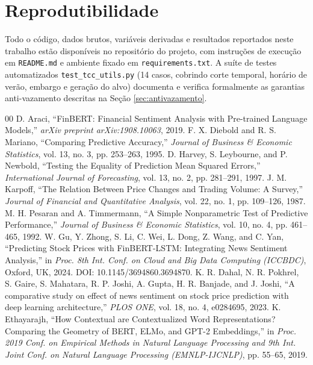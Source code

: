 \documentclass[conference]{IEEEtran}
\begin{document}
\section*{Reprodutibilidade}
Todo o c\'odigo, dados brutos, vari\'aveis derivadas e resultados reportados neste trabalho est\~ao dispon\'iveis no reposit\'orio do projeto, com instru\c{c}\~oes de execu\c{c}\~ao em \texttt{README.md} e ambiente fixado em \texttt{requirements.txt}. A su\'ite de testes automatizados \texttt{test\_tcc\_utils.py} (14 casos, cobrindo corte temporal, hor\'ario de ver\~ao, embargo e gera\c{c}\~ao do alvo) documenta e verifica formalmente as garantias anti-vazamento descritas na Se\c{c}\~ao \ref{sec:antivazamento}.

\begin{thebibliography}{00}
 D. Araci, ``FinBERT: Financial Sentiment Analysis with Pre-trained Language Models,'' \emph{arXiv preprint arXiv:1908.10063}, 2019.
 F. X. Diebold and R. S. Mariano, ``Comparing Predictive Accuracy,'' \emph{Journal of Business \& Economic Statistics}, vol. 13, no. 3, pp. 253--263, 1995.
 D. Harvey, S. Leybourne, and P. Newbold, ``Testing the Equality of Prediction Mean Squared Errors,'' \emph{International Journal of Forecasting}, vol. 13, no. 2, pp. 281--291, 1997.
 J. M. Karpoff, ``The Relation Between Price Changes and Trading Volume: A Survey,'' \emph{Journal of Financial and Quantitative Analysis}, vol. 22, no. 1, pp. 109--126, 1987.
 M. H. Pesaran and A. Timmermann, ``A Simple Nonparametric Test of Predictive Performance,'' \emph{Journal of Business \& Economic Statistics}, vol. 10, no. 4, pp. 461--465, 1992.
 W. Gu, Y. Zhong, S. Li, C. Wei, L. Dong, Z. Wang, and C. Yan, ``Predicting Stock Prices with FinBERT-LSTM: Integrating News Sentiment Analysis,'' in \emph{Proc. 8th Int. Conf. on Cloud and Big Data Computing (ICCBDC)}, Oxford, UK, 2024. DOI: 10.1145/3694860.3694870.
 K. R. Dahal, N. R. Pokhrel, S. Gaire, S. Mahatara, R. P. Joshi, A. Gupta, H. R. Banjade, and J. Joshi, ``A comparative study on effect of news sentiment on stock price prediction with deep learning architecture,'' \emph{PLOS ONE}, vol. 18, no. 4, e0284695, 2023.
 K. Ethayarajh, ``How Contextual are Contextualized Word Representations? Comparing the Geometry of BERT, ELMo, and GPT-2 Embeddings,'' in \emph{Proc. 2019 Conf. on Empirical Methods in Natural Language Processing and 9th Int. Joint Conf. on Natural Language Processing (EMNLP-IJCNLP)}, pp. 55--65, 2019.
\end{thebibliography}
\end{document}
